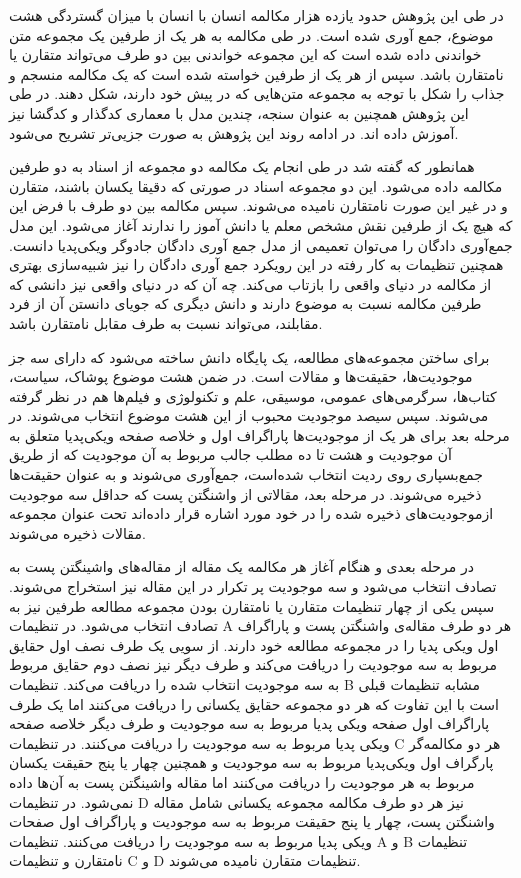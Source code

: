 در طی این پژوهش حدود یازده هزار مکالمه انسان با انسان با میزان گستردگی هشت موضوع، جمع آوری شده است. در طی مکالمه به هر یک از طرفین یک مجموعه متن خواندنی داده شده است که این مجموعه خواندنی بین دو طرف می‌تواند متقارن یا نامتقارن باشد. سپس از هر یک از طرفین خواسته ‌شده است که یک مکالمه منسجم و جذاب را شکل با توجه به مجموعه متن‌هایی که در پیش خود دارند، شکل دهند. 
در طی این پژوهش همچنین به عنوان سنجه،‌ چندین مدل با معماری کدگذار و کدگشا نیز آموزش داده اند. در ادامه روند این پژوهش به صورت جزیی‌تر تشریح می‌شود. 

همانطور که گفته شد در طی انجام یک مکالمه دو مجموعه از اسناد به دو طرفین مکالمه داده می‌شود. این دو مجموعه اسناد در صورتی که دقیقا یکسان باشند، متقارن و در غیر این صورت نامتقارن نامیده می‌شوند. سپس مکالمه بین دو طرف با فرض این که هیچ یک از طرفین نقش مشخص معلم یا دانش آموز را ندارند آغاز می‌شود. این مدل جمع‌آوری دادگان را می‌توان تعمیمی از مدل جمع آوری دادگان جادوگر ویکی‌پدیا دانست. همچنین تنظیمات به کار رفته در این رویکرد جمع آوری دادگان را نیز شبیه‌سازی بهتری از مکالمه در دنیای واقعی را بازتاب می‌کند. چه آن که در دنیای واقعی نیز دانشی که طرفین مکالمه نسبت به موضوع دارند و دانش دیگری که جویای دانستن آن از فرد مقابلند،‌ می‌تواند نسبت به طرف مقابل نامتقارن باشد. 

برای ساختن مجموعه‌های مطالعه، یک پایگاه دانش ساخته می‌شود که دارای سه جز موجودیت‌ها، حقیقت‌ها و مقالات است. در ضمن هشت موضوع پوشاک، سیاست، کتاب‌ها، سرگرمی‌های عمومی، موسیقی، علم و تکنولوژی و فیلم‌ها هم در نظر گرفته می‌شوند.
سپس سیصد موجودیت محبوب از این هشت موضوع انتخاب می‌شوند. 
در مرحله بعد برای هر یک از موجودیت‌ها پاراگراف اول و خلاصه صفحه ویکی‌پدیا 
متعلق به آن موجودیت و هشت تا ده مطلب جالب مربوط به آن موجودیت که از طریق جمع‌بسپاری روی ردیت انتخاب شده‌است، جمع‌آوری می‌شوند و به عنوان حقیقت‌ها ذخیره می‌شوند. 
در مرحله بعد، مقالاتی از واشنگتن پست که حداقل سه موجودیت ازموجودیت‌های ذخیره شده را در خود مورد اشاره قرار داده‌اند تحت عنوان مجموعه مقالات ذخیره می‌شوند.

در مرحله بعدی و هنگام آغاز هر مکالمه یک مقاله از مقاله‌های واشینگتن پست به تصادف انتخاب می‌شود  و سه موجودیت پر تکرار در این مقاله نیز استخراج می‌شوند. 
 سپس یکی از چهار تنظیمات متقارن یا نامتقارن بودن مجموعه مطالعه طرفین نیز به تصادف انتخاب می‌شود.
در تنظیمات A هر دو طرف مقاله‌ی واشنگتن پست و پاراگراف اول  ویکی پدیا را در مجموعه مطالعه خود دارند. از سویی یک طرف نصف اول حقایق مربوط به سه موجودیت را دریافت می‌کند و طرف دیگر نیز نصف دوم حقایق مربوط به سه موجودیت انتخاب شده را دریافت می‌کند.
تنظیمات B مشابه تنظیمات قبلی است با این تفاوت که هر دو مجموعه حقایق یکسانی را دریافت می‌کنند اما یک طرف پاراگراف اول  صفحه ویکی پدیا مربوط به سه موجودیت و طرف دیگر خلاصه صفحه ویکی پدیا مربوط به سه موجودیت را دریافت می‌کنند.
در تنظیمات C هر دو مکالمه‌گر پارگراف اول ویکی‌پدیا مربوط به سه موجودیت و همچنین چهار یا پنج حقیقت یکسان مربوط به هر موجودیت را دریافت می‌کنند اما مقاله واشینگتن پست به آن‌ها داده نمی‌شود. در تنظیمات D نیز هر دو طرف مکالمه مجموعه یکسانی شامل مقاله واشنگتن پست، چهار یا پنج حقیقت مربوط به سه موجودیت و پاراگراف اول صفحات ویکی پدیا مربوط به سه موجودیت را دریافت می‌کنند. تنظیمات A و B تنظیمات نامتقارن و تنظیمات C و D تنظیمات متقارن نامیده می‌شوند.


